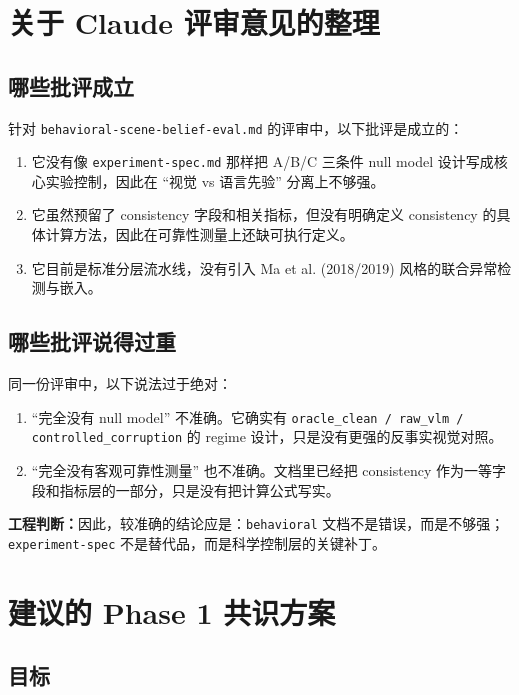 \documentclass[11pt,a4paper]{ctexart}
\newcommand{\engineering}[1]{\textbf{工程判断：}#1}
\begin{document}
\section{关于 Claude 评审意见的整理}

\subsection{哪些批评成立}

针对 \texttt{behavioral-scene-belief-eval.md} 的评审中，以下批评是成立的：
\begin{enumerate}[label=\arabic*.]
  \item 它没有像 \texttt{experiment-spec.md} 那样把 A/B/C 三条件 null model 设计写成核心实验控制，因此在 ``视觉 vs 语言先验'' 分离上不够强。
  \item 它虽然预留了 consistency 字段和相关指标，但没有明确定义 consistency 的具体计算方法，因此在可靠性测量上还缺可执行定义。
  \item 它目前是标准分层流水线，没有引入 Ma et al. (2018/2019) 风格的联合异常检测与嵌入。
\end{enumerate}

\subsection{哪些批评说得过重}

同一份评审中，以下说法过于绝对：
\begin{enumerate}[label=\arabic*.]
  \item ``完全没有 null model'' 不准确。它确实有 \texttt{oracle\_clean / raw\_vlm / controlled\_corruption} 的 regime 设计，只是没有更强的反事实视觉对照。
  \item ``完全没有客观可靠性测量'' 也不准确。文档里已经把 consistency 作为一等字段和指标层的一部分，只是没有把计算公式写实。
\end{enumerate}

\engineering{因此，较准确的结论应是：\texttt{behavioral} 文档不是错误，而是不够强；\texttt{experiment-spec} 不是替代品，而是科学控制层的关键补丁。}

\section{建议的 Phase 1 共识方案}

\subsection{目标}
\end{document}
